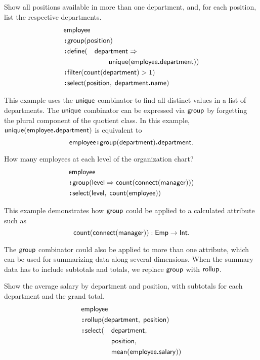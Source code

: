 \begin{demo}
    \label{ex:unique-department}
    Show all positions available in more than one department, and, for each
    position, list the respective departments.
    \begin{alignat*}{2}
        & \Employee\hidewidth &&  \\
        & \Apply\Group(\Position)\hidewidth && \\
        & \Apply\Define(&& \Department\As \\
        & && \qquad \Unique(\Employee\To\Department)) \\
        & \Apply\Filter(\Count(\Department) > 1)\hidewidth && \\
        & \Apply\Select(\Position,\; \Department\To\Name)\hidewidth &&
    \end{alignat*}
\end{demo}

This example uses the $\mathsf{unique}$ combinator to find all distinct values in a
list of departments.  The $\mathsf{unique}$ combinator can be expressed via $\mathsf{group}$ by
forgetting the plural component of the quotient class.  In this example,
$\mathsf{unique}(\mathsf{employee}\boldsymbol{.}\allowbreak\mathsf{department})$ is equivalent to
\begin{equation*}
    \mathsf{employee}\!\boldsymbol{:}\!\mathsf{group}(\mathsf{department})\boldsymbol{.}\mathsf{department}.
\end{equation*}

\begin{demo}
    \label{ex:employee-group-level}
    How many employees at each level of the organization chart?
    \begin{align*}
        & \mathsf{employee} \\
        & \!\boldsymbol{:}\!\mathsf{group}(\mathsf{level}\Rightarrow\mathsf{count}(\mathsf{connect}(\mathsf{manager}))) \\
        & \!\boldsymbol{:}\!\mathsf{select}(\mathsf{level},\; \mathsf{count}(\mathsf{employee}))
    \end{align*}
\end{demo}

This example demonstrates how $\mathsf{group}$ could be applied to a calculated
attribute such as
\begin{equation*}
    \mathsf{count}(\mathsf{connect}(\mathsf{manager})) : \mathsf{Emp} \to \mathsf{Int}.
\end{equation*}

The $\mathsf{group}$ combinator could also be applied to more than one attribute, which
can be used for summarizing data along several dimensions.  When the summary
data has to include subtotals and totals, we replace $\mathsf{group}$ with $\mathsf{rollup}$.

\begin{demo}
    \label{ex:rollup}
    Show the average salary by department and position, with subtotals for each
    department and the grand total.
    \begin{alignat*}{2}
        & \Employee\hidewidth && \\
        & \Apply\Rollup(\Department,\; \Position)\hidewidth && \\
        & \Apply\Select(&& \Department, \\
        & && \Position, \\
        & && \Mean(\Employee\To\Salary))
    \end{alignat*}
\end{demo}

